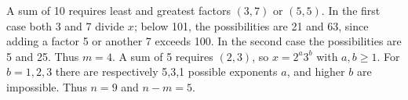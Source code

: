 A sum of 10 requires least and greatest factors $(3,7)$ or $(5,5)$. In the first case both 3 and 7 divide $x$; below 101, the possibilities are 21 and 63, since adding a factor 5 or another 7 exceeds 100. In the second case the possibilities are 5 and 25. Thus $m=4$. A sum of 5 requires $(2,3)$, so $x=2^a3^b$ with $a,b\ge1$. For $b=1,2,3$ there are respectively 5,3,1 possible exponents $a$, and higher $b$ are impossible. Thus $n=9$ and $\boxed{n-m=5}$.
